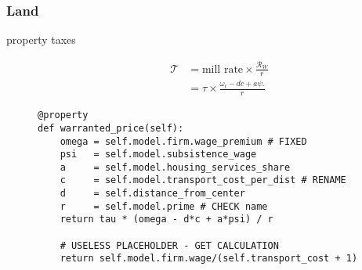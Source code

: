     \subsubsection{Land}
\begin{description}
\item[property taxes]
\begin{align*}
\mathcal{T} &= \text{mill rate} \times \frac{\mathcal{R}_W}{r} \\
&= \tau \times \frac{\omega_t- {dc} + a\psi.}{r}
\end{align*}


\begin{lstlisting}
@property
def warranted_price(self):
    omega = self.model.firm.wage_premium # FIXED
    psi   = self.model.subsistence_wage
    a     = self.model.housing_services_share
    c     = self.model.transport_cost_per_dist # RENAME
    d     = self.distance_from_center
    r     = self.model.prime # CHECK name
    return tau * (omega - d*c + a*psi) / r
    
    # USELESS PLACEHOLDER - GET CALCULATION
    return self.model.firm.wage/(self.transport_cost + 1) 
\end{lstlisting}

\end{description}

